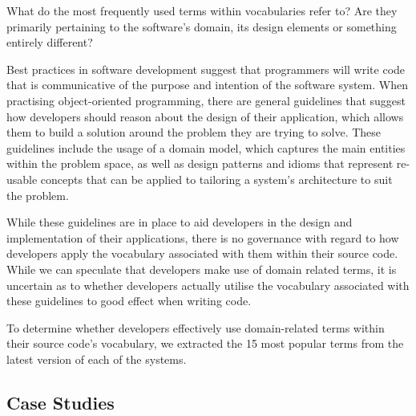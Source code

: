 What do the most frequently used terms within vocabularies refer to? Are they primarily pertaining to the software's domain, its design elements or something entirely different?

Best practices in software development suggest that programmers will write code that is communicative of the purpose and intention of the software system. When practising object-oriented programming, there are general guidelines that suggest how developers should reason about the design of their application, which allows them to build a solution around the problem they are trying to solve. These guidelines include the usage of a domain model, which captures the main entities within the problem space, as well as design patterns and idioms that represent re-usable concepts that can be applied to tailoring a system's architecture to suit the problem.

While these guidelines are in place to aid developers in the design and implementation of their applications, there is no governance with regard to how developers apply the vocabulary associated with them within their source code. While we can speculate that developers make use of domain related terms, it is uncertain as to whether developers actually utilise the vocabulary associated with these guidelines to good effect when writing code.

To determine whether developers effectively use domain-related terms within their source code's vocabulary, we extracted the 15 most popular terms from the latest version of each of the systems.


\subsection{Case Studies} %
\label{sub:case_studies}

% 
% 
% 
% 
% 

